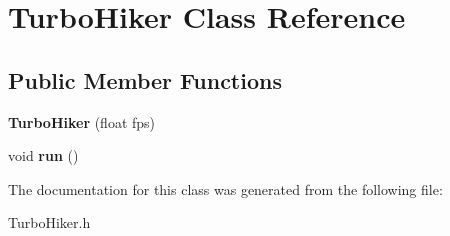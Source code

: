 \hypertarget{class_turbo_hiker}{}\section{Turbo\+Hiker Class Reference}
\label{class_turbo_hiker}
\subsection*{Public Member Functions}
\begin{DoxyCompactItemize}
\item 
\mbox{\label{class_turbo_hiker_afcd90c00a28da42a494c850ca1bcc57f}} 
{\bfseries Turbo\+Hiker} (float fps)
\item 
\mbox{\label{class_turbo_hiker_aba075b3c3bcec452730826893ba60c87}} 
void {\bfseries run} ()
\end{DoxyCompactItemize}


The documentation for this class was generated from the following file\+:\begin{DoxyCompactItemize}
\item 
Turbo\+Hiker.\+h\end{DoxyCompactItemize}
